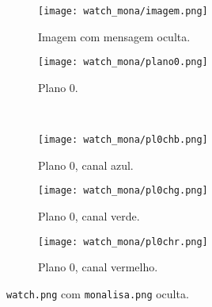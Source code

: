 \begin{figure}[H]
    \centering
    \begin{subfigure}{0.4\textwidth}
        \centering
        \texttt{[image: watch\_mona/imagem.png]}
        \caption{Imagem com mensagem oculta.}
        \label{fig:binmona:imagem}
    \end{subfigure}%
    \begin{subfigure}{0.4\textwidth}
        \centering
        \texttt{[image: watch\_mona/plano0.png]}
        \caption{Plano 0.}
        \label{fig:binmona:plano}
    \end{subfigure}\\[8pt]
    \begin{subfigure}{0.28\textwidth}
        \centering
        \texttt{[image: watch\_mona/pl0chb.png]}
        \caption{Plano 0, canal azul.}
        \label{fig:binmona:blue}
    \end{subfigure}%
    \begin{subfigure}{0.28\textwidth}
        \centering
        \texttt{[image: watch\_mona/pl0chg.png]}
        \caption{Plano 0, canal verde.}
        \label{fig:binmona:green}
    \end{subfigure}%
    \begin{subfigure}{0.28\textwidth}
        \centering
        \texttt{[image: watch\_mona/pl0chr.png]}
        \caption{Plano 0, canal vermelho.}
        \label{fig:binmona:red}
    \end{subfigure}%

    \caption{\texttt{watch.png} com \texttt{monalisa.png} oculta.}
    \label{fig:binmona}
\end{figure}